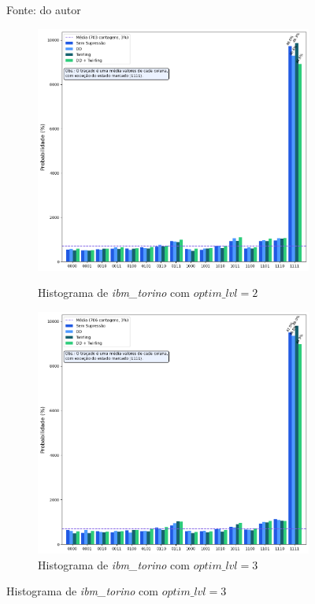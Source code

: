 \begin{figure}[ht!]
    \vspace{0.3em}
    {\small Fonte: do autor} 
\end{figure}

\begin{figure}[ht!]
    \centering
    \captionsetup{justification=centering}
    \caption{Resultados de \textit{ibm\_torino}}
    \label{fig:resultTorino}

    \begin{subfigure}[b]{0.46\textwidth}
        \centering
        \caption{Histograma de \textit{ibm\_torino} com $optim\_lvl = 2$}
        \includegraphics[width=\linewidth]{Imagens/resultTorino_2.png}
        \label{subfig:resultTorino_2}
    \end{subfigure}
    \hspace{1cm}
    \begin{subfigure}[b]{0.46\textwidth}
        \centering
        \caption{Histograma de \textit{ibm\_torino} com $optim\_lvl = 3$}
        \includegraphics[width=\linewidth]{Imagens/resultTorino_3.png}

\end{subfigure}
\end{figure}

